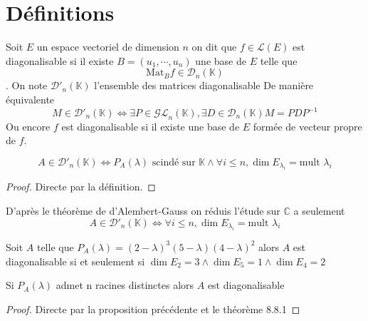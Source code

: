 \documentclass[11pt,colorlinks]{book}
\theoremstyle{mytheoremstyle}
\theoremstyle{mytheoremstyle}
\theoremstyle{mytheoremstyle}
\theoremstyle{mytheoremstyle}
\theoremstyle{mytheoremstyle}
\theoremstyle{mytheoremstyle}
\theoremstyle{mytheoremstyle}
\theoremstyle{mytheoremstyle}
\theoremstyle{myproblemstyle}
\def\mbb#1{\mathbb{#1}}
\def\mfc#1{\mathcal{#1}}
\def\bC{\mbb{C}}
\def\bK{\mbb{K}}
\def\ev{espace vectoriel }
\begin{document}
\section{Définitions}
\begin{definition}
  Soit $E$ un \ev de dimension $n$ on dit que $f \in \mfc{L}(E)$ est diagonalisable si il existe $B = (u_1,\cdots,u_n)$ une base de $E$ telle 
  que 
  \begin{equation*}
    \text{Mat}_{B} f \in \mfc{D}_n(\bK)
  \end{equation*}. On note $\mfc{D}'_n(\bK)$ l'ensemble des matrices diagonalisable
  De manière équivalente 
  \begin{equation*}
    M \in \mfc{D}'_n(\bK) \Leftrightarrow \exists P \in \mfc{GL}_n(\bK), \exists D \in \mfc{D}_n(\bK) M = PDP^{-1}
  \end{equation*}
  Ou encore $f$ est diagonalisable si il existe une base de $E$ formée de vecteur propre de $f$.
\end{definition}
\begin{prop}
  \begin{equation*}
    A \in \mfc{D'}_n(\bK) \Leftrightarrow P_A(\lambda) \text{ scindé sur } \bK \wedge \forall i \leq n, \dim E_{\lambda_i} = \text{mult } \lambda_i  
  \end{equation*}
  \begin{proof}
    Directe par la définition.
  \end{proof}
\end{prop}
\begin{rmq}
  D'après le théorème de d'Alembert-Gauss on réduis l'étude sur $\bC$ a seulement 
  \begin{equation*}
    A \in \mfc{D'}_n(\bK) \Leftrightarrow \forall i \leq n, \dim E_{\lambda_i} = \text{mult } \lambda_i  
  \end{equation*}
\end{rmq}
\begin{ex}
  Soit $A$ telle que $P_A(\lambda) = (2-\lambda)^3 (5-\lambda) (4 - \lambda)^2$ alors 
  $A$ est diagonalisable si et seulement si $\dim E_{2} = 3 \wedge \dim E_{5} = 1 \wedge \dim E_{4} = 2$
\end{ex}
\begin{rmq}
  Si $P_A(\lambda)$ admet n racines distinctes alors $A$ est diagonalisable 
  \begin{proof}
    Directe par la proposition précédente et le théorème 8.8.1
  \end{proof}
\end{rmq}
\end{document}

